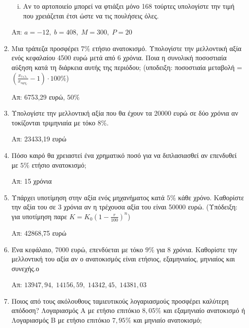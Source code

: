 \begin{enumerate}
\begin{enumerate}[i)]
            \item Αν το αρτοποιείο μπορεί να φτιάξει μόνο 168 τούρτες
                υπολογίστε την τιμή που χρειάζεται έτσι ώστε να τις πουλήσεις
                όλες.

        \end{enumerate}

        \hfill Απ: $ a=-12,\; b=408,\; M=300,\; P=20 $ 

    \item Μια τράπεζα προσφέρει $ 7\% $ ετήσιο ανατοκισμό. Υπολογίστε 
        την μελλοντική αξία ενός κεφαλαίου 4500 ευρώ μετά από 6 χρόνια. 
        Ποια η συνολική ποσοστιαία αύξηση κατά τη διάρκεια αυτής της 
        περιόδου; (υποδειξη: ποσοστιαία μεταβολή = 
        $ (\frac{x_{\text{τελ.}}}{ x_{\text{αρχ.}}} - 1)\cdot 100\% $)

        \hfill Απ: 6753,29 ευρώ, $ 50\% $ 

    \item Υπολογίστε την μελλοντική αξία που θα έχουν τα 20000 ευρώ σε δύο 
        χρόνια αν τοκίζονται τριμηνιαία με τόκο $ 8\% $.

        \hfill Απ: 23433,19 ευρώ 


    \item Πόσο καιρό θα χρειαστεί ένα χρηματικό ποσό για να διπλασιασθεί αν 
        επενδυθεί με $ 5\% $ ετήσιο ανατοκισμό;

        \hfill Απ: 15 χρόνια 

    \item Υπάρχει υποτίμηση στην αξία ενός μηχανήματος κατά $ 5\% $ κάθε 
        χρόνο. Καθορίστε την αξία του σε 3 χρόνια αν η τρέχουσα αξία του
        είναι 50000 ευρώ.
        (Υπόδειξη: για υποτίμηση παρε $ K=K_{0}(1- \frac{r}{100})^{n} $)

        \hfill Απ: 42868,75 ευρώ 

    \item Ένα κεφάλαιο, 7000 ευρώ, επενδύεται με τόκο $ 9\% $ για 8 
        χρόνια. Καθορίστε την μελλοντική του αξία αν ο ανατοκισμός είναι
        ετήσιος, εξαμηνιαίος, μηνιαίος και συνεχής.ο

        \hfill Απ: $ 13947,94,\; 14156,59,\; 14342,45,\; 14381,03 $

    \item Ποιος από τους ακόλουθους ταμιευτικούς λογαριασμούς προσφέρει 
        καλύτερη απόδοση?
        Λογαριασμός Α με ετήσιο επιτόκιο $ 8,05\% $ και εξαμηνιαίο 
        ανατοκισμό ή Λογαριασμός Β με ετήσιο επιτόκιο $ 7,95\% $ και 
        μηνιαίο ανατοκισμό;


\end{enumerate}
